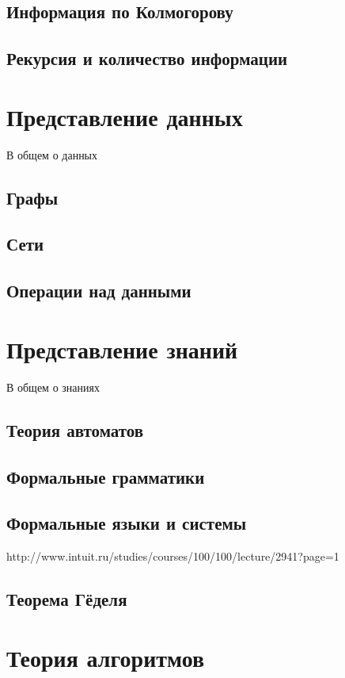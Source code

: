 \documentclass[b5paper,11pt]{book}
\begin{document}
	\section{Информация по Колмогорову}
	\section{Рекурсия и количество информации}
	
	
	\chapter{Представление данных}
	В общем о данных
	
	\section{Графы}
	
	\section{Сети}
	
	\section{Операции над данными}
	
	\chapter{Представление знаний}
	В общем о знаниях
	
	\section{Теория автоматов}
	\section{Формальные грамматики}
	\section{Формальные языки и системы}
		http://www.intuit.ru/studies/courses/100/100/lecture/2941?page=1
	\section{Теорема Гёделя}
	
	\chapter{Теория алгоритмов}
	
\end{document}
